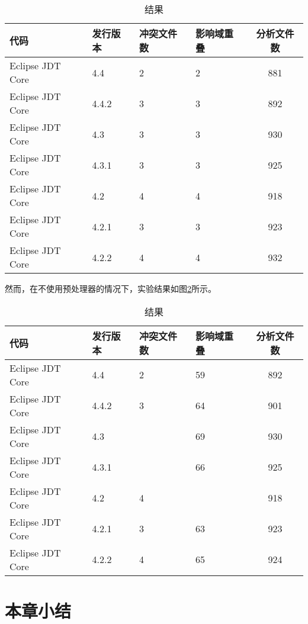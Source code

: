 \begin{table}[H]
	\caption{结果}
	\label{data_compatible}
	\centering
	\begin{tabular}{llllc}
		\toprule[1.5pt]
		{\heiti 代码} & {\heiti 发行版本} & {\heiti 冲突文件数} & {\heiti 影响域重叠} & {\heiti 分析文件数} \\\midrule[1pt]
		Eclipse JDT Core & 4.4 	& 2 & 2 & 881\\
		Eclipse JDT Core & 4.4.2 & 3 & 3 & 892\\
		Eclipse JDT Core & 4.3 	& 3 & 3 & 930\\
		Eclipse JDT Core & 4.3.1 & 3 & 3 & 925\\
		Eclipse JDT Core & 4.2 	& 4 & 4 & 918\\
		Eclipse JDT Core & 4.2.1 & 3  &	3 & 923\\
		Eclipse JDT Core & 4.2.2 & 4 & 4 & 932\\
		\bottomrule[1.5pt]
	\end{tabular}
\end{table}

然而，在不使用预处理器的情况下，实验结果如图\ref {data_compatible_2}所示。

\begin{table}[H]
	\caption{结果}
	\label{data_compatible_2}
	\centering
	\begin{tabular}{llllc}
		\toprule[1.5pt]
		{\heiti 代码} & {\heiti 发行版本} & {\heiti 冲突文件数} & {\heiti 影响域重叠} & {\heiti 分析文件数} \\\midrule[1pt]
		Eclipse JDT Core & 4.4 	& 2 & 59 &	892	\\
		Eclipse JDT Core & 4.4.2 & 3 & 64 &  901 \\
		Eclipse JDT Core & 4.3 	& & 69 & 930 \\
		Eclipse JDT Core & 4.3.1 & & 66 & 925\\
		Eclipse JDT Core & 4.2 	& 4 & & 918	\\
		Eclipse JDT Core & 4.2.1 & 3 & 63 & 923\\
		Eclipse JDT Core & 4.2.2 & 4 & 65 & 924\\
		\bottomrule[1.5pt]
	\end{tabular}
\end{table}


\section{本章小结}